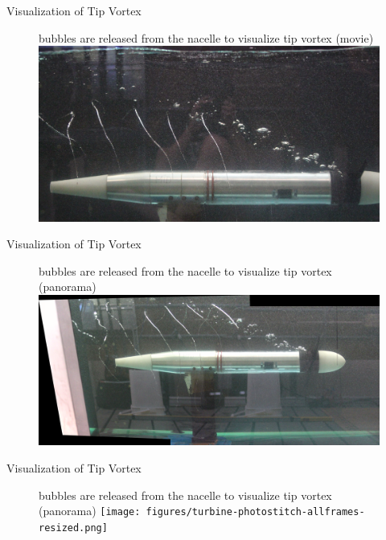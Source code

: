 \documentclass[xcolor=x11names,compress]{beamer}
\begin{document}
	\begin{frame}{Visualization of Tip Vortex}

		\begin{figure}[p]
		    \item bubbles are released from the nacelle to visualize tip vortex (movie)
		    \centering
		    \includegraphics[width=1.0\textwidth]{figures/turbine_tip_vortex_and_bubbles.png}
		\end{figure}

	\end{frame}

	\begin{frame}{Visualization of Tip Vortex}

		\begin{figure}[p]
		    \item bubbles are released from the nacelle to visualize tip vortex (panorama)
		    \centering
		    \includegraphics[width=1.05\textwidth]{figures/turbine-photostitch-63-79-93-resized.png}
		\end{figure}

	\end{frame}	

	\begin{frame}{Visualization of Tip Vortex}

		\begin{figure}[p]
		    \item bubbles are released from the nacelle to visualize tip vortex (panorama)
		    \centering
		    \texttt{[image: figures/turbine-photostitch-allframes-resized.png]}
		\end{figure}

	\end{frame}	
\end{document}
